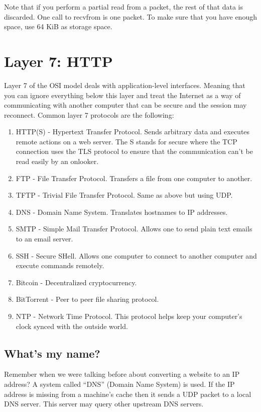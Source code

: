 Note that if you perform a partial read from a packet, the rest of that data is discarded.
One call to recvfrom is one packet.
To make sure that you have enough space, use 64 KiB as storage space.

\section{Layer 7: HTTP}

Layer 7 of the OSI model deals with application-level interfaces.
Meaning that you can ignore everything below this layer and treat the Internet as a way of communicating with another computer that can be secure and the session may reconnect.
Common layer 7 protocols are the following:

\begin{enumerate}
  \item HTTP(S) - Hypertext Transfer Protocol.
    Sends arbitrary data and executes remote actions on a web server.
    The S stands for secure where the TCP connection uses the TLS protocol to ensure that the communication can't be read easily by an onlooker.
  \item FTP - File Transfer Protocol.
    Transfers a file from one computer to another.
  \item TFTP - Trivial File Transfer Protocol.
    Same as above but using UDP.
  \item DNS - Domain Name System.
    Translates hostnames to IP addresses.
  \item SMTP - Simple Mail Transfer Protocol.
    Allows one to send plain text emails to an email server.
  \item SSH - Secure SHell.
    Allows one computer to connect to another computer and execute commands remotely.
  \item Bitcoin - Decentralized cryptocurrency.
  \item BitTorrent - Peer to peer file sharing protocol.
  \item NTP - Network Time Protocol.
    This protocol helps keep your computer's clock synced with the outside world.
\end{enumerate}

\subsection{What's my name?}

Remember when we were talking before about converting a website to an IP address?
A system called ``DNS'' (Domain Name System) is used.
If the IP address is missing from a machine's cache then it sends a UDP packet to a local DNS server.
This server may query other upstream DNS servers.

